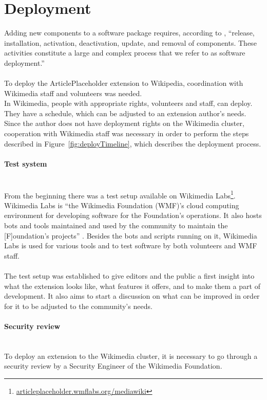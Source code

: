 \section{Deployment}

Adding new components to a software package requires, according to \citet{deployment}, ``release, installation, activation, deactivation, update, and removal of components. These activities constitute a large and complex process that we refer to as software deployment.'' \\
\\
To deploy the ArticlePlaceholder extension to Wikipedia, coordination with Wikimedia staff and volunteers was needed. \\
In Wikimedia, people with appropriate rights, volunteers and staff, can deploy. They have a schedule, which can be adjusted to an extension author's needs. Since the author does not have deployment rights on the Wikimedia cluster, cooperation with Wikimedia staff was necessary in order to perform the steps described in Figure~\ref{fig:deployTimeline}, which describes the deployment process. \\



\paragraph{Test system} ~\\
From the beginning there was a test setup available on Wikimedia Labs\footnote{\url{articleplaceholder.wmflabs.org/mediawiki}}. Wikimedia Labs is ``the Wikimedia Foundation (WMF)'s cloud computing environment for developing software for the Foundation's operations. It also hosts bots and tools maintained and used by the community to maintain the [F]oundation's projects'' \citep{wiki:03}.
Besides the bots and scripts running on it, Wikimedia Labs is used for various tools and to test software by both volunteers and WMF staff. \\
\\
The test setup was established to give editors and the public a first insight into what the extension looks like, what features it offers, and to make them a part of development. It also aims to start a discussion on what can be improved in order for it to be adjusted to the community's needs.

\paragraph{Security review} ~\\
To deploy an extension to the Wikimedia cluster, it is necessary to go through a security review by a Security Engineer of the Wikimedia Foundation. 
  
